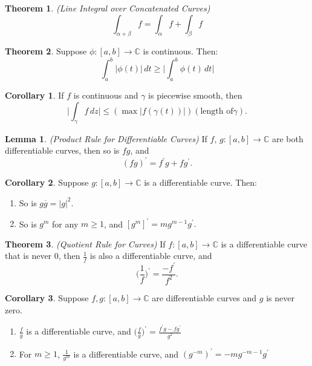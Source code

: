 \documentclass[a4paper]{article}
\theoremstyle{definition}
\newtheorem{theorem}{Theorem}
\newtheorem{lemma}{Lemma}
\newtheorem{corollary}{Corollary}
\begin{document}
	\begin{theorem}
		\emph{(Line Integral over Concatenated Curves)}
		$$\int_{\alpha + \beta} f = \int_{\alpha} f + \int_{\beta} f$$
	\end{theorem}
	
	\begin{theorem}
		Suppose $\phi : [a,b] \rightarrow \mathbb{C}$ is continuous. Then:
		$$\int_{a}^{b}|\phi(t)| \, dt \geq \bigg | \int_{a}^{b}\phi(t) \, dt \bigg |$$
	\end{theorem}
	
	\begin{corollary}
		If $f$ is continuous and $\gamma$ is piecewise smooth, then
		$$\bigg | \int_{\gamma} f \, dz \bigg | \leq (\max | f(\gamma(t)) |) (\text{length of} \gamma).$$
	\end{corollary}
	
	\begin{lemma}
		\emph{(Product Rule for Differentiable Curves)}
		If $f$, $g : [a,b] \rightarrow \mathbb{C}$ are both differentiable curves, then so is $fg$, and
		$$(fg)^{\prime} = f^{\prime}g + fg^{\prime}.$$
	\end{lemma}
	
	\begin{corollary}
		Suppose $g : [a,b] \rightarrow \mathbb{C}$ is a differentiable curve. Then:
		\begin{enumerate}[label=\alph*.]
			\item So is $g \overline{g} = |g|^{2}.$
			\item So is $g^{m}$ for any $m \geq 1$, and $[g^{m}]^{\prime} = m g^{m-1} g^{\prime}.$
		\end{enumerate}
	\end{corollary}
	
	\begin{theorem}
		\emph{(Quotient Rule for Curves)}
		If $f: [a,b] \rightarrow \mathbb{C}$ is a differentiable curve that is never 0, then $\frac{1}{f}$ is also a differentiable curve, and
		$$\bigg(\frac{1}{f}\bigg)^{\prime} =  \frac{-f^{\prime}}{f^2}.$$
	\end{theorem}
	
	\begin{corollary}
		Suppose $f,g: [a,b] \rightarrow \mathbb{C}$ are differentiable curves and $g$ is never zero.
		\begin{enumerate}[label=\alph*.]
			\item $\frac{f}{g}$ is a differentiable curve, and $\big(\frac{f}{g}\big)^{\prime} = \frac{f^{\prime}g - f g^{\prime}}{g^2}$
			\item For $m \geq 1$, $\frac{1}{g^m}$ is a differentiable curve, and $(g^{-m})^{\prime} = -mg^{-m-1}g^{\prime}$
		\end{enumerate}
	\end{corollary}
	
\end{document}
